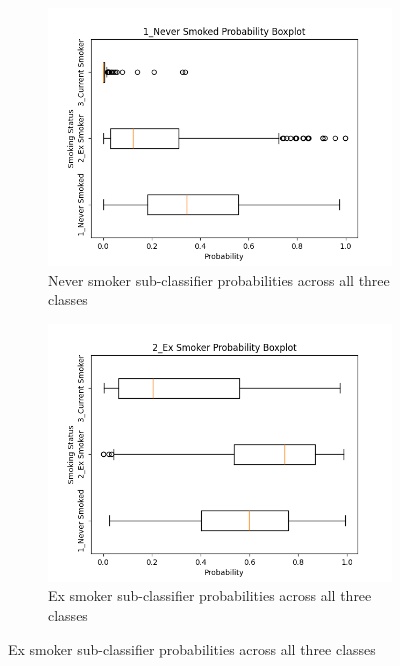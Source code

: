 \documentclass{article}
\begin{document}
\begin{figure}
    \centering
    \begin{subfigure}{0.48\textwidth}
        \centering
        \includegraphics[width=\linewidth]{cohort2_1_boxplot.png}
        \caption{Never smoker sub-classifier probabilities across all three classes}
    \end{subfigure}
    \hfill
    \begin{subfigure}{0.48\textwidth}
        \centering
        \includegraphics[width=\linewidth]{cohort2_2_boxplot.png}
        \caption{Ex smoker sub-classifier probabilities across all three classes}
    \end{subfigure}
    \par\vspace{0.5em}

\end{figure}
\end{document}
